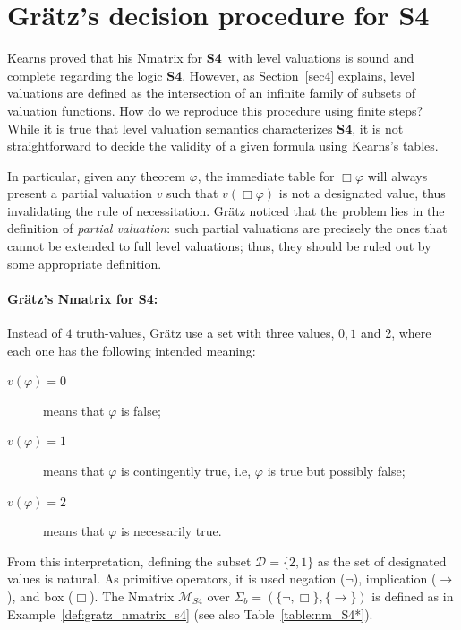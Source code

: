 \documentclass[12pt]{article}
\newcommand{\sfo}{\textbf{S4}}
\begin{document}
\section{Gr\"atz's decision procedure for \sfo} \label{Sect:Gratz}


Kearns proved that his Nmatrix for \sfo\ with level valuations is sound and complete regarding the logic \sfo. However, as Section~\ref{sec4} explains, level valuations are defined as the intersection of an infinite family of subsets of valuation functions. How do we reproduce this procedure using finite steps? While it is true that level valuation semantics characterizes \sfo, it is not straightforward to decide the validity of a given formula using Kearns's tables.

In particular, given any theorem $\varphi$, the immediate table for $\Box \varphi$ will always present a partial valuation $v$ such that $v(\Box \varphi)$ is not a designated value, thus invalidating the rule of necessitation. Gr\"atz noticed that the problem lies in the definition of \textit{partial valuation}: such partial valuations are precisely the ones that cannot be extended to full level valuations; thus, they should be ruled out by some appropriate definition. 

\paragraph{Gr\"atz's Nmatrix for \sfo:} Instead of $4$ truth-values, Gr\"atz use a set with three values, $0, 1$ and $2$, where each one has the following intended meaning:

\begin{description}
    \item[$v(\varphi) = 0$] means that $\varphi$ is false;
    \item[$v(\varphi) = 1$] means that $\varphi$ is contingently true, i.e, $\varphi$ is true but possibly false;
    \item[$v(\varphi) = 2$] means that $\varphi$ is necessarily true.
\end{description}

From this interpretation, defining the subset $\mathcal{D} = \{ 2, 1 \}$ as the set of designated values is natural. As primitive operators, it is used negation ($\neg$), implication ($\to$), and box ($\Box$). The Nmatrix  $\mathcal{M}_{S4}$ over  $\Sigma_b = ( \{ \neg, \Box \}, \{\rightarrow\} )$ is defined as  in Example~\ref{def:gratz_nmatrix_s4} (see also Table~\ref{table:nm_S4*}).
\end{document}
